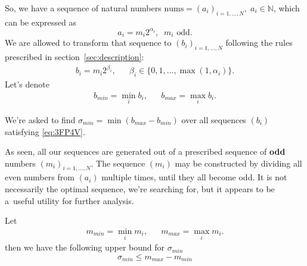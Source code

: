 \documentclass[paper=a4,parskip=half,DIV=12]{leetcode}
\begin{document}
So, we have a sequence of natural numbers $\mathrm{nums} = ( a_i )_{i=1,\dots,
N}, \; a_i \in \mathbb{N}$, which can be expressed as
\begin{equation}
  a_i = m_i 2^{\alpha_i}, \;\; m_i \text{ odd}.
  \label{eq:DLHTR}
\end{equation}
We are allowed to transform that sequence to $( b_i )_{i=1,\dots,N}$
following the rules prescribed in section~\ref{sec:description}:
\begin{equation}
  \begin{aligned}
    b_i = m_i 2^{\beta_i}, && \beta_i \in \{ 0, 1, \dots, \max{(1, \alpha_i)} \}.
  \end{aligned}
  \label{eq:3FP4V}
\end{equation}
Let's denote
\begin{equation}
  \begin{aligned}
    b_{min} = \min_i b_i, && b_{max} = \max_i b_i.
  \end{aligned}
  \label{eq:JB95I}
\end{equation}

We're asked to find $\sigma_{min} = \min{(b_{max} - b_{min})}$ over all
sequences $( b_i )$ satisfying \eqref{eq:3FP4V}.

As seen, all our sequences are generated out of a prescribed sequence of
\textbf{odd} numbers $( m_i )_{i=1,\dots,N}$. The sequence $(m_i)$ may be
constructed by dividing all even numbers from $(a_i)$ multiple times, until
they all become odd. It is not necessarily the optimal sequence, we're
searching for, but it appears to be a~useful utility for further analysis.

Let
\begin{equation}
  \begin{aligned}
    & m_{min} = \min_i m_i, &
    & m_{max} = \max_i m_i.&
  \end{aligned}
  \label{eq:7M3YV}
\end{equation}
then we have the following upper bound for $\sigma_{min}$
\begin{equation}
  \sigma_{min} \le m_{max} - m_{min}
  \label{eq:66HJL}
\end{equation}
\end{document}
